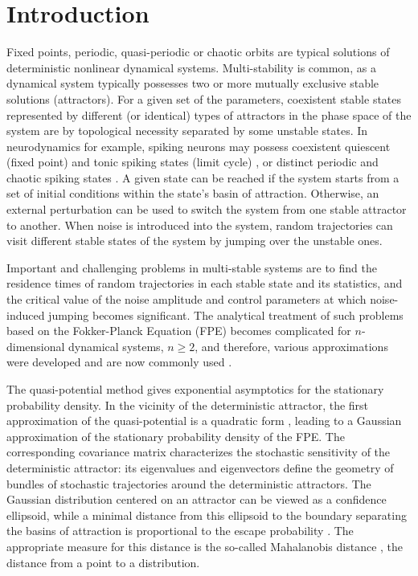 \section{Introduction}\label{sect1}
\noindent
Fixed points, periodic, quasi-periodic or chaotic orbits 
are typical solutions of deterministic nonlinear dynamical
systems. Multi-stability is common, as  a dynamical
system typically  possesses two or more mutually exclusive stable
solutions (attractors). For a given set of the parameters,
coexistent stable states represented by different (or identical) types
of attractors in the phase space of the system are by topological
necessity separated by some unstable states. In neurodynamics for
example, spiking neurons may possess coexistent quiescent (fixed
point) and tonic spiking states (limit cycle) \cite{Paydarfar}, or
distinct periodic and chaotic spiking states \cite{G. Cymbalyuk}.
A given state can be reached if the system starts from a set of
initial conditions within the state's basin of attraction.
Otherwise, an external perturbation can be used to switch the
system from one stable attractor to another. When noise is introduced into
the system, random trajectories can visit different stable states 
of the system by jumping over the unstable ones. 

Important and challenging problems in multi-stable systems are to
find the residence times of random trajectories in each stable state and
its statistics, and the critical value of the noise amplitude and
control parameters at which noise-induced jumping becomes
significant. The analytical treatment of such problems based on the
Fokker-Planck Equation (FPE) becomes complicated for $n$-dimensional
dynamical systems, $n\geq2$, and therefore, various approximations
were developed and are now commonly used \cite{N. G. Van
Kampen,M.I Freidlin}. 

The quasi-potential method gives exponential
asymptotics for the stationary probability density. In the
vicinity of the deterministic attractor, the first approximation
of the quasi-potential is a quadratic form \cite{G. Mil'shtein},
leading to a Gaussian approximation of the stationary probability
density of the FPE. The corresponding covariance matrix characterizes the 
stochastic sensitivity of the deterministic attractor: its
eigenvalues and eigenvectors define the geometry of bundles of
stochastic trajectories around the deterministic attractors.
The Gaussian distribution centered on an attractor can be viewed as a
confidence ellipsoid, while a minimal distance from this ellipsoid
to the boundary separating the basins of attraction is proportional to
the escape probability \cite{I. Bashkirtseva}. The appropriate
measure for this distance is the so-called Mahalanobis distance
\cite{P. C. Mahalanobis}, the distance from a point to a
distribution.

